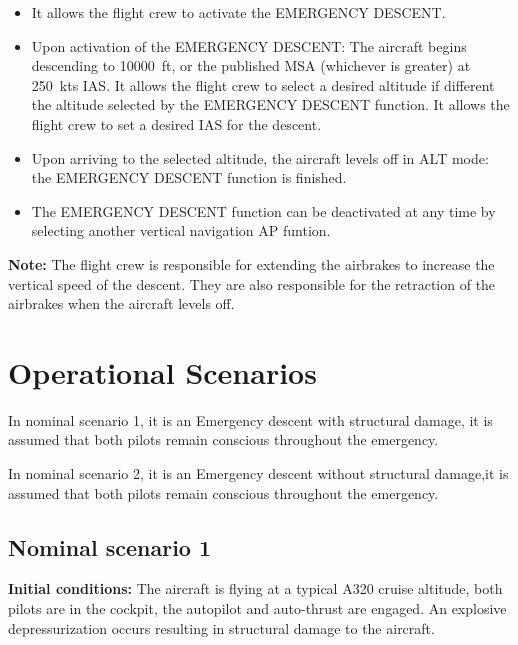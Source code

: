 \documentclass[12pt,oneside]{scrreprt}
\begin{document}
\begin{itemize}
	\item It allows the flight crew to activate the EMERGENCY DESCENT. 
	\item Upon activation of the EMERGENCY DESCENT:
		\subitem The aircraft begins descending to \SI{10000}{ft}, or the published MSA (whichever is greater) at \SI{250}{kts} IAS.
		\subitem It allows the flight crew to select a desired altitude if different the altitude selected by the EMERGENCY DESCENT function.
		\subitem It allows the flight crew to set a desired IAS for the descent. 
	\item Upon arriving to the selected altitude, the aircraft levels off in ALT mode: the EMERGENCY DESCENT function is finished. 
	\item The EMERGENCY DESCENT function can be deactivated at any time by selecting another vertical navigation AP funtion. 
\end{itemize}


\textbf{Note:} The flight crew is responsible for extending the airbrakes to increase the vertical speed of the descent. They are also responsible for the retraction of the airbrakes when the aircraft levels off. 

\chapter{Operational Scenarios}
\label{sec:OS}

In nominal scenario 1, it is an Emergency descent with structural damage, it is assumed that both pilots remain conscious throughout the emergency. 

In nominal scenario 2, it is an Emergency descent without structural damage,it is assumed that both pilots remain conscious throughout the emergency.

\section{Nominal scenario 1}

\textbf{Initial conditions:} The aircraft is flying at a typical A320 cruise altitude, both pilots are in the cockpit, the autopilot and auto-thrust are engaged. An explosive depressurization occurs resulting in
structural damage to the aircraft.
\end{document}
